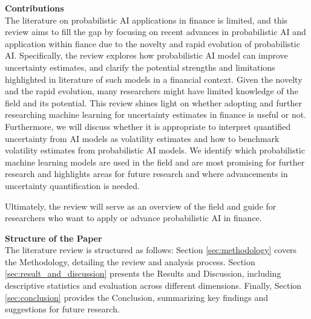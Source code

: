  
\textbf{Contributions}\\
The literature on probabilistic AI applications in finance is limited, and this review aims to fill the gap by focusing on recent advances in probabilistic AI and application within fiance due to the novelty and rapid evolution of probabilistic AI. Specifically, the review explores how probabilistic AI model can improve uncertainty estimates, and clarify the potential strengths and limitations highlighted in literature of such models in a financial context. Given the novelty and the rapid evolution, many researchers might have limited knowledge of the field and its potential. This review shines light on whether adopting and further researching machine learning for uncertainty estimates in finance is useful or not. Furthermore, we will discuss whether it is appropriate to interpret quantified uncertainty from AI models as volatility estimates and how to benchmark volatility estimates from probabilistic AI models. We identify which probabilistic machine learning models are used in the field and are most promising for further research and highlights areas for future research and where advancements in uncertainty quantification is needed. 

Ultimately, the review will serve as an overview of the field and guide for researchers who want to apply or advance probabilistic AI in finance. 


\textbf{Structure of the Paper}\\
The literature review is structured as follows: Section \ref{sec:methodology} covers the Methodology, detailing the review and analysis process. Section \ref{sec:result_and_discussion} presents the Results and Discussion, including descriptive statistics and evaluation across different dimensions. Finally, Section \ref{sec:conclusion} provides the Conclusion, summarizing key findings and suggestions for future research. 